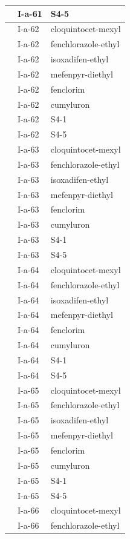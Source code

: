 \documentclass[11pt,a4paper]{article}
\begin{document}
\begin{table}[h]
\begin{tabular}{|l|l|l|}
 & I-a-61 & S4-5 \\ \hline
 & I-a-62 & cloquintocet-mexyl \\ \hline
 & I-a-62 & fenchlorazole-ethyl \\ \hline
 & I-a-62 & isoxadifen-ethyl \\ \hline
 & I-a-62 & mefenpyr-diethyl \\ \hline
 & I-a-62 & fenclorim \\ \hline
 & I-a-62 & cumyluron \\ \hline
 & I-a-62 & S4-1 \\ \hline
 & I-a-62 & S4-5 \\ \hline
 & I-a-63 & cloquintocet-mexyl \\ \hline
 & I-a-63 & fenchlorazole-ethyl \\ \hline
 & I-a-63 & isoxadifen-ethyl \\ \hline
 & I-a-63 & mefenpyr-diethyl \\ \hline
 & I-a-63 & fenclorim \\ \hline
 & I-a-63 & cumyluron \\ \hline
 & I-a-63 & S4-1 \\ \hline
 & I-a-63 & S4-5 \\ \hline
 & I-a-64 & cloquintocet-mexyl \\ \hline
 & I-a-64 & fenchlorazole-ethyl \\ \hline
 & I-a-64 & isoxadifen-ethyl \\ \hline
 & I-a-64 & mefenpyr-diethyl \\ \hline
 & I-a-64 & fenclorim \\ \hline
 & I-a-64 & cumyluron \\ \hline
 & I-a-64 & S4-1 \\ \hline
 & I-a-64 & S4-5 \\ \hline
 & I-a-65 & cloquintocet-mexyl \\ \hline
 & I-a-65 & fenchlorazole-ethyl \\ \hline
 & I-a-65 & isoxadifen-ethyl \\ \hline
 & I-a-65 & mefenpyr-diethyl \\ \hline
 & I-a-65 & fenclorim \\ \hline
 & I-a-65 & cumyluron \\ \hline
 & I-a-65 & S4-1 \\ \hline
 & I-a-65 & S4-5 \\ \hline
 & I-a-66 & cloquintocet-mexyl \\ \hline
 & I-a-66 & fenchlorazole-ethyl \\ \hline

\end{tabular}
\end{table}
\end{document}

